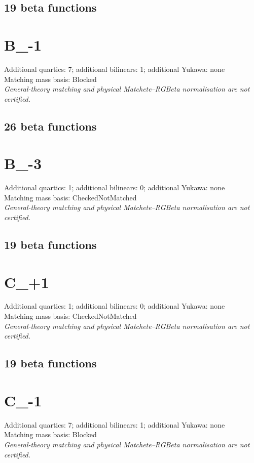 \documentclass[10pt,a4paper]{article}
\begin{document}
\subsection*{19 beta functions}

\clearpage
\section{B\_-1}
Additional quartics: 7; additional bilinears: 1; additional Yukawa: none\\
Matching mass basis: Blocked\\
\emph{General-theory matching and physical Matchete--RGBeta normalisation are not certified.}
\subsection*{26 beta functions}

\clearpage
\section{B\_-3}
Additional quartics: 1; additional bilinears: 0; additional Yukawa: none\\
Matching mass basis: CheckedNotMatched\\
\emph{General-theory matching and physical Matchete--RGBeta normalisation are not certified.}
\subsection*{19 beta functions}

\clearpage
\section{C\_+1}
Additional quartics: 1; additional bilinears: 0; additional Yukawa: none\\
Matching mass basis: CheckedNotMatched\\
\emph{General-theory matching and physical Matchete--RGBeta normalisation are not certified.}
\subsection*{19 beta functions}

\clearpage
\section{C\_-1}
Additional quartics: 7; additional bilinears: 1; additional Yukawa: none\\
Matching mass basis: Blocked\\
\emph{General-theory matching and physical Matchete--RGBeta normalisation are not certified.}
\end{document}
